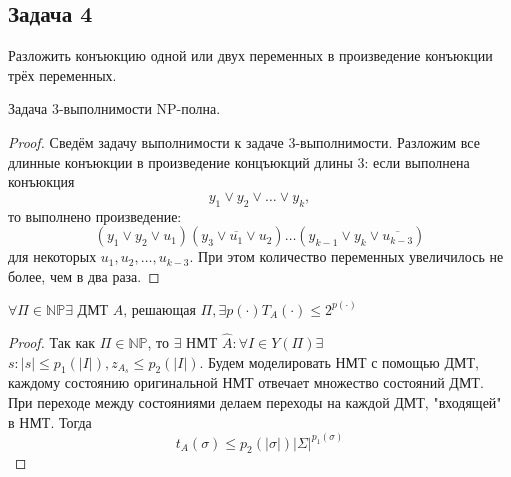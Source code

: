 \documentclass[11pt]{article}
\newcounter{th}\setcounter{th}{0}
\def\th{\par\smallskip\refstepcounter{th}\textbf{\arabic{th}}}
\newtheorem*{Theorem}{Теорема \th}
\newcounter{stnmt}\setcounter{stnmt}{0}
\def\st{\par\smallskip\refstepcounter{stnmt}\textbf{\arabic{stnmt}}}
\newtheorem*{Statement}{Утверждение \st}
\begin{document}
\subsection{Задача 4}
\label{sec:orgd95e351}
Разложить конъюкцию одной или двух переменных в произведение конъюкции трёх переменных.
\begin{Statement}
Задача 3-выполнимости NP-полна.
\end{Statement}
\begin{proof}
Сведём задачу выполнимости к задаче 3-выполнимости. Разложим все длинные конъюкции в
произведение концъюкций длины 3: если выполнена конъюкция
\begin{equation*}
y_1 \vee y_2 \vee \ldots \vee y_k,
\end{equation*}
то выполнено произведение:
\begin{equation*}
(y_1 \vee y_2 \vee u_1)(y_3 \vee \overline{u_1} \vee u_2)\ldots(y_{k - 1} \vee y_k \vee \overline{u_{k - 3}})
\end{equation*}
для некоторых $u_1, u_2, \ldots, u_{k - 3}$. При этом количество переменных увеличилось не более,
чем в два раза.
\end{proof}
\begin{Theorem}
$\forall \Pi \in \mathbb{NP} \exists \text{ ДМТ } A \text{, решающая } \Pi, \exists p(\cdot)
T_A(\cdot) \leq 2^{p(\cdot)}$
\end{Theorem}
\begin{proof}
Так как $\Pi \in \mathbb{NP}$, то $\exists \text{ НМТ } \hat{A}: \forall I \in Y(\Pi) \exists$
$s: |s| \leq p_1(|I|), z_{A_s} \leq p_2(|I|)$. Будем моделировать НМТ с помощью ДМТ,
каждому состоянию оригинальной НМТ отвечает множество состояний ДМТ. При переходе между
состояниями делаем переходы на каждой ДМТ, "входящей" в НМТ. Тогда
\begin{equation*}
t_A(\sigma) \leq p_2(|\sigma|)|\Sigma|^{p_1(\sigma)}
\end{equation*}
\end{proof}
\end{document}
